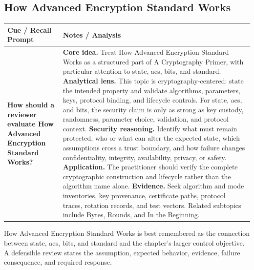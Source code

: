 \documentclass[11pt]{article}
\newcommand{\CornellHeader}{%
\rowcolor{Navy}\color{white}\bfseries Cue / Recall Prompt & \color{white}\bfseries Notes / Analysis\\\hline}
\newcommand{\CornellRow}[2]{%
\cellcolor{CueGray}\RaggedRight\textbf{#1} & \RaggedRight #2\\\hline}
\begin{document}
\subsection*{How Advanced Encryption Standard Works}
\begin{longtable}{>{\RaggedRight\arraybackslash}p{}|>{\RaggedRight\arraybackslash}p{}}
\CornellHeader
\CornellRow{How should a reviewer evaluate How Advanced Encryption Standard Works?}{\textbf{Core idea.} Treat How Advanced Encryption Standard Works as a structured part of A Cryptography Primer, with particular attention to state, aes, bits, and standard. \textbf{Analytical lens.} This topic is cryptography-centered: state the intended property and validate algorithms, parameters, keys, protocol binding, and lifecycle controls. For state, aes, and bits, the security claim is only as strong as key custody, randomness, parameter choice, validation, and protocol context. \textbf{Security reasoning.} Identify what must remain protected, who or what can alter the expected state, which assumptions cross a trust boundary, and how failure changes confidentiality, integrity, availability, privacy, or safety. \textbf{Application.} The practitioner should verify the complete cryptographic construction and lifecycle rather than the algorithm name alone. \textbf{Evidence.} Seek algorithm and mode inventories, key provenance, certificate paths, protocol traces, rotation records, and test vectors. Related subtopics include Bytes, Rounds, and In the Beginning.}
\end{longtable}
\begin{topicsummary}
How Advanced Encryption Standard Works is best remembered as the connection between state, aes, bits, and standard and the chapter's larger control objective. A defensible review states the assumption, expected behavior, evidence, failure consequence, and required response.
\end{topicsummary}
\end{document}
